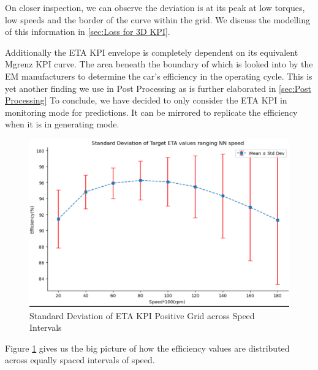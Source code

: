 \documentclass{report} %
\begin{document}
On closer inspection, we can observe the deviation is at its peak at low torques, low speeds and the border of the curve within the grid.
We discuss the modelling of this information in \ref{sec:Loss for 3D KPI}.

Additionally the ETA \ac{KPI} envelope is completely dependent on its equivalent Mgrenz \ac{KPI} curve. 
The area beneath the boundary of which is looked into by the \ac{EM} manufacturers to determine the car's efficiency in the operating cycle.
This is yet another finding we use in Post Processing as is further elaborated in \ref{sec:Post Processing}
To conclude, we have decided to only consider the ETA \ac{KPI} in monitoring mode for predictions. It can be mirrored to replicate the efficiency when it is in generating mode.\\

\begin{figure}[H]
    \centering
    \includegraphics[width=1\textwidth]{./ReportImages/stddev_y2_nn.png} 
    \caption{Standard Deviation of ETA \ac{KPI} Positive Grid across Speed Intervals} 
    \label{fig:Standard Deviation of 3D KPI(ETA) Positive Grid across Speed Intervals}
\end{figure}

Figure \ref{fig:Standard Deviation of 3D KPI(ETA) Positive Grid across Speed Intervals} gives us the big picture of how the efficiency values are distributed across equally spaced intervals of speed.
\end{document}
